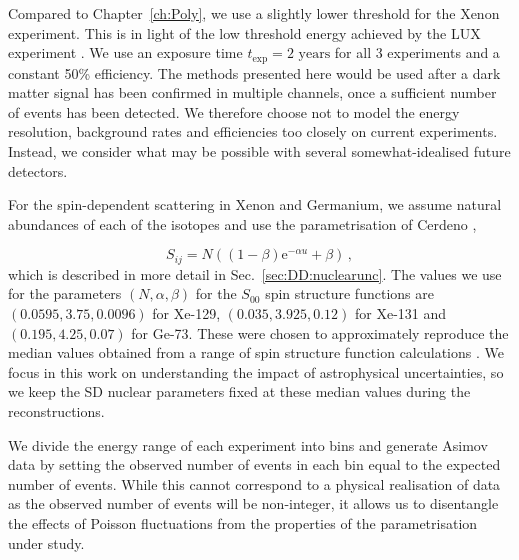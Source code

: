 Compared to Chapter~\ref{ch:Poly}, we use a slightly lower threshold for the Xenon experiment. This is in light of the low threshold energy achieved by the LUX experiment \cite{Akerib:2014}. We use an exposure time $t_\textrm{exp} = 2 \textrm{ years}$ for all 3 experiments and a constant 50\% efficiency. The methods presented here would be used after a dark matter signal has been confirmed in multiple channels, once a sufficient number of events has been detected. We therefore choose not to model the energy resolution, background rates and efficiencies too closely on current experiments. Instead, we consider what may be possible with several somewhat-idealised future detectors.

For the spin-dependent scattering in Xenon and Germanium, we assume natural abundances of each of the isotopes and use the parametrisation of Cerdeno \etal \cite{Cerdeno:2012},

\begin{equation}
\label{eq:NT:SDparametrization}
S_{ij} = N ((1-\beta)\mathrm{e}^{-\alpha u} + \beta)\,,
\end{equation}
which is described in more detail in Sec.~\ref{sec:DD:nuclearunc}. The values we use 
for the parameters $(N, \alpha, \beta)$ for the $S_{00}$ spin structure functions are $(0.0595, 3.75, 0.0096)$ for Xe-129, 
$(0.035, 3.925, 0.12)$ for Xe-131 and $(0.195, 4.25, 0.07)$ for Ge-73. These 
were chosen to approximately reproduce the median values obtained from a range 
of spin structure function calculations \cite{Ressel:1993,Dimitrov:1995,Ressell:1997,Menendez:2012}. We focus in this work on understanding the impact of astrophysical uncertainties, so we keep the SD nuclear parameters fixed at these median values during the reconstructions.

We divide the energy range of each experiment into bins and generate Asimov data \cite{Cowan:2013} by setting the observed number of events in each bin equal to the expected number of events. While this cannot correspond to a physical realisation of data as the observed number of events will be non-integer, it allows us to disentangle the effects of Poisson fluctuations from the properties of the parametrisation under study.

